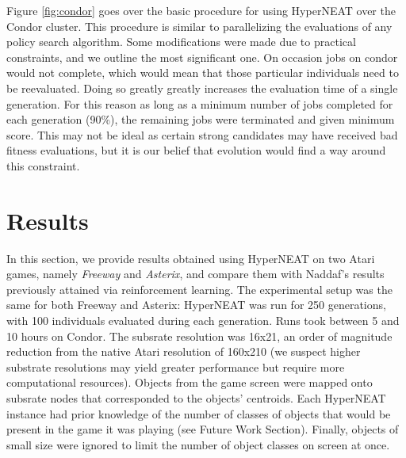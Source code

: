 \documentclass{acm_proc_article-sp}
\begin{document}

Figure \ref{fig:condor} goes over the basic procedure for using HyperNEAT over the Condor cluster. This procedure is similar to parallelizing the evaluations of any policy search algorithm. Some modifications were made due to practical constraints, and we outline the most significant one. On occasion jobs on condor would not complete, which would mean that those particular individuals need to be reevaluated. Doing so greatly greatly increases the evaluation time of a single generation. For this reason as long as a minimum number of jobs completed for each generation (90\%), the remaining jobs were terminated and given minimum score. This may not be ideal as certain strong candidates may have received bad fitness evaluations, but it is our belief that evolution would find a way around this constraint.

\section{Results}
\label{sec:results}
In this section, we provide results obtained using HyperNEAT on two Atari games, namely \textit{Freeway} and \textit{Asterix}, and compare them with Naddaf's results previously attained via reinforcement learning. The experimental setup was the same for both Freeway and Asterix: HyperNEAT was run for 250 generations, with 100 individuals evaluated during each generation. Runs took between 5 and 10 hours on Condor. The subsrate resolution was 16x21, an order of magnitude reduction from the native Atari resolution of 160x210 (we suspect higher substrate resolutions may yield greater performance but require more computational resources). Objects from the game screen were mapped onto subsrate nodes that corresponded to the objects' centroids. Each HyperNEAT instance had prior knowledge of the number of classes of objects that would be present in the game it was playing (see Future Work Section). Finally, objects of small size were ignored to limit the number of object classes on screen at once.
\end{document}

